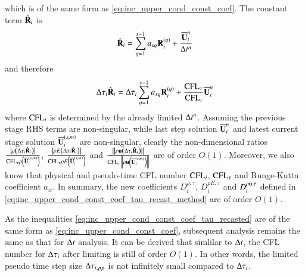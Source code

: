 which is of the same form as \eqref{eq:inc_upper_cond_const_coef}.
The constant term  $\hat{\mathbf{R}}_i$ is
\begin{equation}
        \hat{\mathbf{R}}_i  = \sum_{q=1}^{s-1} a_{sq} \mathbf{R}_i^{\left(q\right)} +
    \dfrac{\overline{\mathbf{U}}_i^{n}}{\mathrm\Delta t^n} 
\end{equation}
and therefore
\begin{equation}
        \mathrm\Delta\tau_i\hat{\mathbf{R}}_i  = \mathrm\Delta\tau_i\sum_{q=1}^{s-1} a_{sq} \mathbf{R}_i^{\left(q\right)} +
    \dfrac{\text{CFL}_\tau}{\text{CFL}_i}\overline{\mathbf{U}}_i^{n} 
\end{equation}
where $\text{CFL}_i$ is determined by the already limited $\mathrm\Delta t^n$.
Assuming the previous stage RHS terms are non-singular, while 
last step solution $\overline{\mathbf{U}}_i^n$ and 
latest current stage solution $\overline{\mathbf{U}}_i^{\left(s,m\right)}$ are non-singular, clearly the 
non-dimensional ratios 
$\frac{\left| \rho\left(\mathrm\Delta\tau_i \hat{\mathbf{R}}_i\right) \right|}
{ \text{CFL}_\tau\rho\left( \overline{\mathbf{U}}_i^{\left(s,m\right)} \right)}$,
$\frac{\left| \rho E\left(\mathrm\Delta\tau_i \hat{\mathbf{R}}_i\right) \right|}
{ \text{CFL}_\tau\rho E\left( \overline{\mathbf{U}}_i^{\left(s,m\right)} \right)}$ and 
$\frac{\left\|\rho\mathbf{u}\left(\mathrm\Delta\tau_i \hat{\mathbf{R}}_i\right) \right\|}
{ \text{CFL}_\tau\left\|\rho \mathbf{u}\left( \overline{\mathbf{U}}_i^{\left(s,m\right)} \right)\right\|}$
are of order $O(1)$. 
Moreover, we also know that physical and pseudo-time CFL number $\text{CFL}_i$, $\text{CFL}_\tau$ and 
Runge-Kutta coefficient $a_{ii}$.
In summary, the new coefficients $D^{\rho,\tau}_i$, $D^{\rho E,\tau}_i$ 
and $D^{\rho \mathbf{u},\tau}_i$ defined in \eqref{eq:inc_upper_cond_const_coef_tau_recast_method}
are of order $O(1)$. 

As the inequalities \eqref{eq:inc_upper_cond_const_coef_tau_recasted}
are of the same form as \eqref{eq:inc_upper_cond_const_coef}, 
subsequent analysis remains the same as that for $\mathrm\Delta t$ analysis. 
It can be derived that simlilar to $\mathrm\Delta t$, the CFL number 
for $\mathrm\Delta \tau _i$ after limiting is still of order $O(1)$.
In other words, the limited pseudo time step size $\mathrm\Delta \tau_{i,pp}$ is not infinitely small compared to $\mathrm\Delta \tau_i$.



